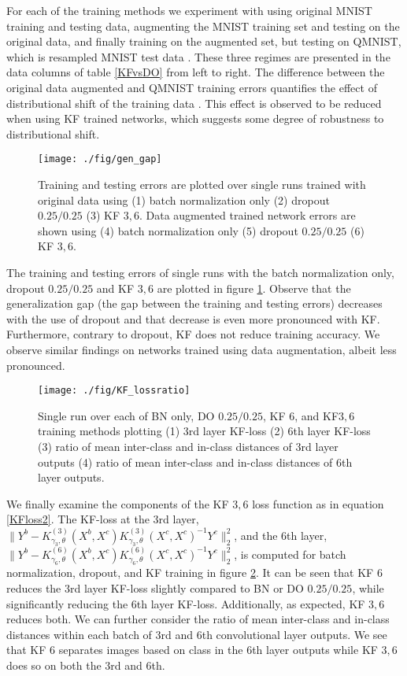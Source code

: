 \documentclass[11pt]{article}
\begin{document}
For each of the training methods we experiment with using original MNIST training and testing data, augmenting the MNIST training set and testing on the original data, and finally training on the augmented set, but testing on QMNIST, which is resampled MNIST test data \cite{qmnist}.  These three regimes are presented in the data columns of table \ref{KFvsDO} from left to right.  The difference between the original data augmented and QMNIST training errors quantifies the effect of distributional shift of the training data \cite{indistshift}.  This effect is observed to be reduced when using KF trained networks, which suggests some degree of robustness to distributional shift.
\begin{figure}[h!]
	\begin{center}
			\texttt{[image: ./fig/gen\_gap]}
		\caption{Training and testing errors are plotted over single runs trained with original data using (1) batch normalization only (2) dropout $0.25/0.25$ (3) KF $3, 6$.  Data augmented trained network errors are shown using (4) batch normalization only (5) dropout $0.25/0.25$ (6) KF $3,6$.}\label{gengap}
	\end{center}
\end{figure}
The training and testing errors of single runs with the batch normalization only, dropout $0.25/0.25$ and KF $3,6$ are plotted in figure \ref{gengap}.  Observe that the generalization gap (the gap between the training and testing errors) decreases with the use of dropout and that decrease is even more pronounced with KF.  Furthermore, contrary to dropout,  KF does not reduce training accuracy.  We observe similar findings on networks trained using data augmentation, albeit less pronounced.
\begin{figure}[h!]
	\begin{center}
			\texttt{[image: ./fig/KF\_lossratio]}
		\caption{Single run over each of BN only, DO $0.25/0.25$, KF $6$, and KF$3,6$ training methods plotting (1) 3rd layer KF-loss (2) 6th layer KF-loss (3) ratio of mean inter-class and in-class distances of 3rd layer outputs (4) ratio of mean inter-class and in-class distances of 6th layer outputs.}\label{KF_lossratio}
	\end{center}
\end{figure}
We finally examine the components of the KF $3,6$ loss function as in equation \eqref{KFloss2}.  The KF-loss at the 3rd layer, $ \|Y^b - K^{(3)}_{\gamma_3,\theta}(X^b,X^c) K^{(3)}_{\gamma_3,\theta}(X^c,X^c)^{-1} Y^c\|_2^2$, and the 6th layer, $\|Y^b - K^{(6)}_{\gamma_6,\theta}(X^b,X^c) K^{(6)}_{\gamma_6,\theta}(X^c,X^c)^{-1} Y^c\|_2^2$, is computed for batch normalization, dropout, and KF training in figure \ref{KF_lossratio}.  It can be seen that KF $6$ reduces the 3rd layer KF-loss slightly compared to BN or DO $0.25/0.25$, while significantly reducing the 6th layer KF-loss.  Additionally, as expected, KF $3,6$ reduces both.  We can further consider the ratio of mean inter-class and in-class distances within each batch of 3rd and 6th convolutional layer outputs.  We see that KF $6$ separates images based on class in the 6th layer outputs while KF $3,6$ does so on both the 3rd and 6th.
\end{document}
